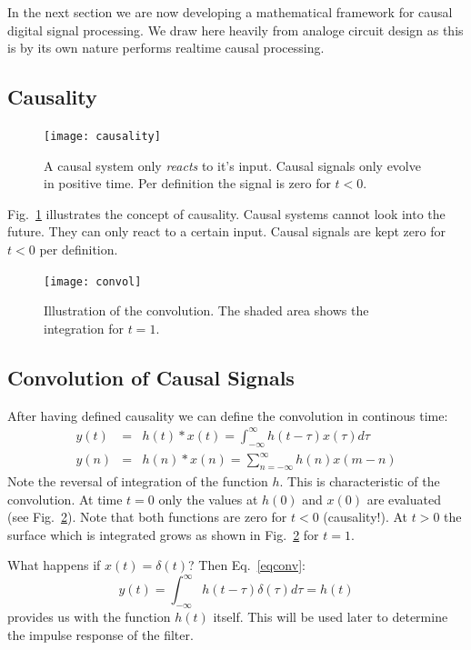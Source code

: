 \documentclass[12pt,a4paper]{article}
\begin{document}
In the next section we are now developing a mathematical
framework for causal digital signal processing. We draw
here heavily from analoge circuit design as this is by
its own nature performs realtime causal processing.


\subsection{Causality}
\begin{figure}[!hbt]
\begin{center}
\mbox{\texttt{[image: causality]}}
\end{center}
\caption{A causal system only \textsl{reacts} to it's input.
Causal signals only evolve in positive time. Per definition the
signal is zero for $t<0$.
\label{causality}}
\end{figure}
Fig.~\ref{causality} illustrates the concept of causality.
Causal systems cannot look into the future. They can only react
to a certain input. Causal signals are kept zero for $t<0$
per definition.

\begin{figure}[!hbt]
\begin{center}
\mbox{\texttt{[image: convol]}}
\end{center}
\caption{Illustration of the convolution. The shaded area
shows the integration for $t=1$.
\label{convolution}}
\end{figure}

\subsection{Convolution of Causal Signals}
After having defined causality we can define the convolution in continous time:
\begin{eqnarray} 
  y(t) & = & h(t) * x(t) = \int_{-\infty}^{\infty} h(t - \tau) x(\tau) d\tau \\
  y(n) & = & h(n) * x(n) = \sum_{n = -\infty}^\infty h(n) x(m - n)
\label{eqconv}
\end{eqnarray}
Note the reversal of integration of the function $h$. This
is characteristic of the convolution. At time $t=0$
only the values at $h(0)$ and $x(0)$ are evaluated 
(see Fig.~\ref{convolution}). Note
that both functions are zero for $t<0$ (causality!).
At $t>0$ the surface which is integrated grows as shown
in Fig.~\ref{convolution} for $t=1$.

What happens if $x(t)=\delta(t)$? Then Eq.~\ref{eqconv}:
\begin{equation} 
y(t) = \int_{-\infty}^{\infty} h(t - \tau) \delta(\tau) d\tau = h(t)
\label{convdelta}
\end{equation}
provides us with the function $h(t)$ itself. This will
be used later to determine the impulse response of the
filter.
\end{document}
